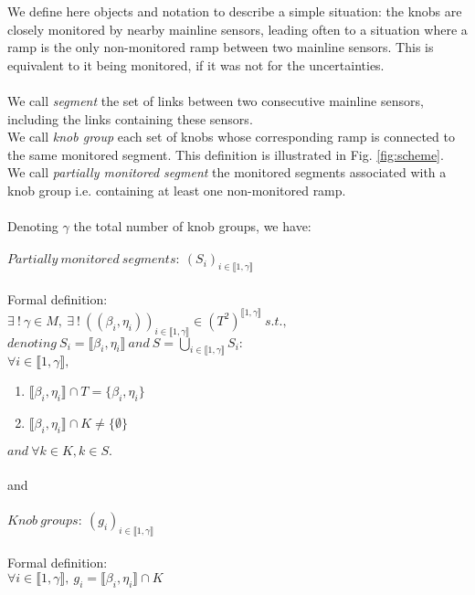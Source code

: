 We define here objects and notation to describe a simple situation: the knobs are closely monitored by nearby mainline sensors, leading often to a situation where a ramp is the only non-monitored ramp between two mainline sensors. This is equivalent to it being monitored, if it was not for the uncertainties.\\
\\
We call \emph{segment} the set of links between two consecutive mainline sensors, including the links containing these sensors. \\
We call \emph{knob group} each set of knobs whose corresponding ramp is connected to the same monitored segment.
This definition is illustrated in Fig. \ref{fig:scheme}.\\
We call \emph{partially monitored segment} the monitored segments associated with a knob group i.e. containing at least one non-monitored ramp.\\
\\
Denoting $\gamma$ the total number of knob groups, we have:\\
\\
$Partially\ monitored\ segments:\ (S_{i})_{i \in \llbracket 1,\gamma \rrbracket}$\\ 
\\
Formal definition:\\
$\exists\ !\ \gamma\in M,\ \exists\ !\ ((\beta_{i},\eta_{i}))_{i\in\llbracket 1,\gamma\rrbracket}\in (T^2)^{\llbracket 1,\gamma\rrbracket}\ s.t.,$\\
$denoting\ S_{i}=\llbracket \beta_{i},\eta_{i} \rrbracket\ and\ S=\underset{i\in \llbracket 1,\gamma \rrbracket}{\bigcup}  S_{i}:$\\
$\forall i\in\llbracket 1,\gamma \rrbracket,$
\begin{enumerate}
	\item $\llbracket \beta_{i},\eta_{i} \rrbracket \cap T=\{\beta_{i},\eta_{i}\}$
	\item $\llbracket \beta_{i}, \eta_{i} \rrbracket \cap K\not= \{\emptyset \}$
\end{enumerate}
$and\ \forall k\in K, k\in S.$\\
\\
and\\
\\
$Knob\ groups:\ (g_{i})_{i\in \llbracket 1,\gamma \rrbracket}$\\
\\
Formal definition:\\
$\forall i \in \llbracket 1, \gamma \rrbracket,\ g_{i}=\llbracket \beta_{i}, \eta_{i} \rrbracket \cap K $\\
